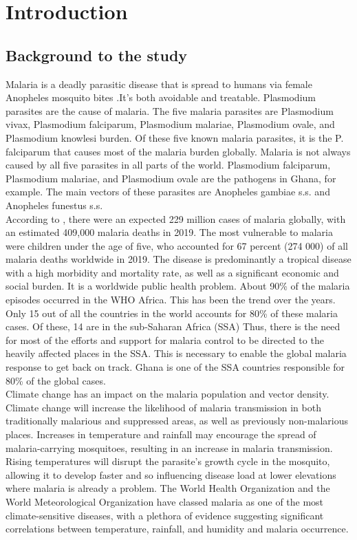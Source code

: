 \label{chapter1}

\chapter{Introduction}
\section{Background to the study}
Malaria is a deadly parasitic disease that is spread to humans via female Anopheles mosquito bites \citep{world2014malaria}.It's both avoidable and treatable. Plasmodium parasites are the cause of malaria.
The five malaria parasites are Plasmodium vivax, Plasmodium falciparum, Plasmodium malariae, Plasmodium ovale, and Plasmodium knowlesi burden. Of these five known malaria parasites, it is the P. falciparum that causes most of the malaria burden globally. Malaria is not always caused by all five parasites in all parts of the world. Plasmodium falciparum, Plasmodium malariae, and Plasmodium ovale are the pathogens in Ghana, for example. The main vectors of these parasites are Anopheles gambiae s.s. and Anopheles funestus s.s.\\

\noindent According to \cite{world2020malaria}, there were an expected 229 million cases of malaria globally, with an estimated 409,000 malaria deaths in 2019. The most vulnerable to malaria were children under the age of five, who accounted for 67 percent (274 000) of all malaria deaths worldwide in 2019. The disease is predominantly a tropical disease with a high morbidity and mortality rate, as well as a significant economic and social burden.
It is a worldwide public health problem. About 90\% of the malaria episodes occurred in the WHO Africa. This has been the trend over the years.
Only 15 out of all the countries in the world accounts for 80\% of these malaria cases. Of these, 14 are in the sub-Saharan Africa (SSA)
Thus, there is the need for most of the efforts and support for malaria control to be directed to the heavily affected places in the SSA. This is necessary to enable the global malaria response to get back on track.
Ghana is one of the SSA countries responsible for 80\% of the global cases.\\

\noindent Climate change has an impact on the malaria population and vector density. Climate change will increase the likelihood of malaria transmission in both traditionally malarious and suppressed areas, as well as previously non-malarious places. Increases in temperature and rainfall may encourage the spread of malaria-carrying mosquitoes, resulting in an increase in malaria transmission. Rising temperatures will disrupt the parasite's growth cycle in the mosquito, allowing it to develop faster and so influencing disease load at lower elevations where malaria is already a problem. The World Health Organization and the World Meteorological Organization have classed malaria as one of the most climate-sensitive diseases, with a plethora of evidence suggesting significant correlations between temperature, rainfall, and humidity and malaria occurrence.\\


